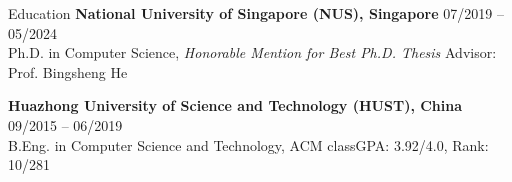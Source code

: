 \begin{rSection}{Education}
{\bf National University of Singapore (NUS), Singapore} \hfill {07/2019 -- 05/2024}\\
Ph.D. in Computer Science, \;\textit{Honorable Mention for Best Ph.D. Thesis} \hfill {Advisor: Prof. Bingsheng He}

{\bf Huazhong University of Science and Technology (HUST), China} \hfill {09/2015 -- 06/2019}\\
B.Eng. in Computer Science and Technology, ACM class\hfill GPA: 3.92/4.0, Rank: 10/281
\end{rSection}
